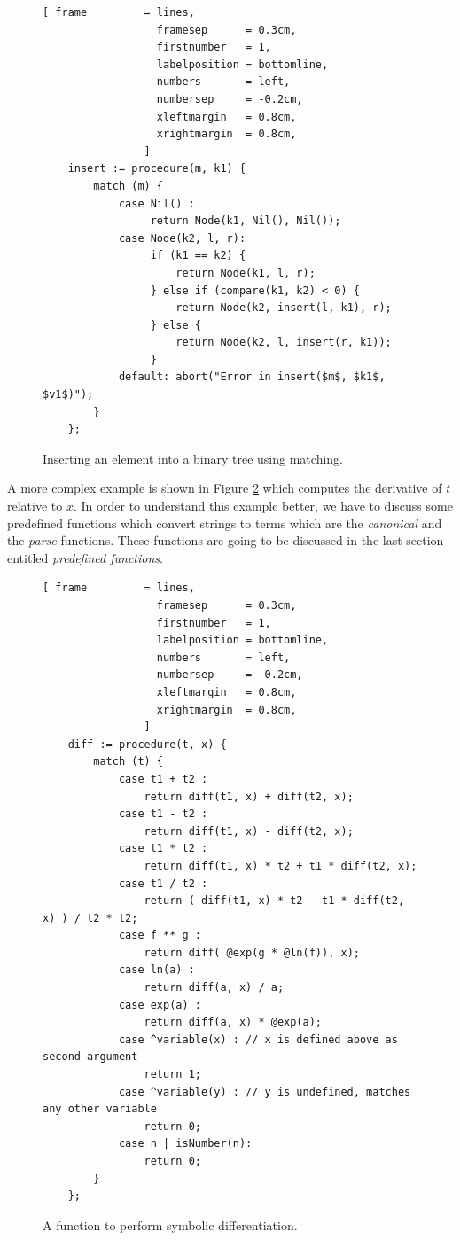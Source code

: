 \documentclass[11pt]{report}
\begin{document}
\begin{figure}[!ht]
\centering
\begin{Verbatim}[ frame         = lines, 
                  framesep      = 0.3cm, 
                  firstnumber   = 1,
                  labelposition = bottomline,
                  numbers       = left,
                  numbersep     = -0.2cm,
                  xleftmargin   = 0.8cm,
                  xrightmargin  = 0.8cm,
                ]
    insert := procedure(m, k1) {
        match (m) {
            case Nil() : 
                 return Node(k1, Nil(), Nil());
            case Node(k2, l, r): 
                 if (k1 == k2) {
                     return Node(k1, l, r);
                 } else if (compare(k1, k2) < 0) { 
                     return Node(k2, insert(l, k1), r);
                 } else {
                     return Node(k2, l, insert(r, k1));
                 }
            default: abort("Error in insert($m$, $k1$, $v1$)");
        }
    };
\end{Verbatim}
\vspace*{-0.3cm}
\caption{Inserting an element into a binary tree using matching.}
\label{fig:binary-tree.stlx}
\end{figure}

A more complex example is shown in Figure \ref{fig:diff.stlx} which computes the derivative of $t$ relative to $x$. In order to understand this example better, we have to discuss some predefined functions which convert strings to terms which are the \textsl{canonical} and the \textsl{parse} functions. These functions are going to be discussed in the last section entitled \textsl{predefined functions}.

\begin{figure}[!ht]
\centering
\begin{Verbatim}[ frame         = lines, 
                  framesep      = 0.3cm, 
                  firstnumber   = 1,
                  labelposition = bottomline,
                  numbers       = left,
                  numbersep     = -0.2cm,
                  xleftmargin   = 0.8cm,
                  xrightmargin  = 0.8cm,
                ]
    diff := procedure(t, x) {
        match (t) {
            case t1 + t2 :
                return diff(t1, x) + diff(t2, x);
            case t1 - t2 :
                return diff(t1, x) - diff(t2, x);
            case t1 * t2 :
                return diff(t1, x) * t2 + t1 * diff(t2, x);
            case t1 / t2 :
                return ( diff(t1, x) * t2 - t1 * diff(t2, x) ) / t2 * t2;
            case f ** g :
                return diff( @exp(g * @ln(f)), x);
            case ln(a) :
                return diff(a, x) / a;
            case exp(a) :
                return diff(a, x) * @exp(a);
            case ^variable(x) : // x is defined above as second argument
                return 1;
            case ^variable(y) : // y is undefined, matches any other variable
                return 0;
            case n | isNumber(n):   
                return 0;  
        }
    };
\end{Verbatim}
\vspace*{-0.3cm}
\caption{A function to perform symbolic differentiation.}
\label{fig:diff.stlx}
\end{figure}
\end{document}
